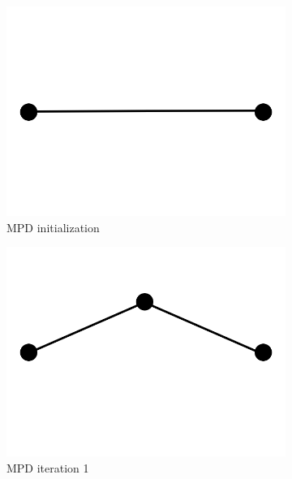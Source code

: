 \documentclass[11pt,a4paper,twoside,openright]{report}
\begin{document}
\begin{figure}[h]
  \centering
  \begin{subfigure}[b]{0.32\textwidth}
    \includegraphics[width=\textwidth]{mpd0.png}
    \caption{MPD initialization}
    \label{fig:mpd0}
  \end{subfigure}
  \begin{subfigure}[b]{0.32\textwidth}
    \includegraphics[width=\textwidth]{mpd1.png}
    \caption{MPD iteration 1}
    \label{fig:mpd1}
  \end{subfigure}
  \begin{subfigure}[b]{0.32\textwidth}

\end{subfigure}
\end{figure}
\end{document}
